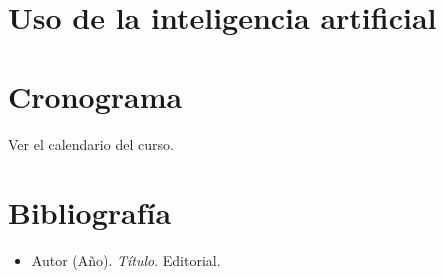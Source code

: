 \documentclass{academic-report}
\begin{document}
\section{Uso de la inteligencia artificial}

\section{Cronograma}
Ver el calendario del curso.

\section{Bibliografía}
\begin{itemize}
  \item Autor (Año). \emph{Título}. Editorial.
\end{itemize}
\end{document}
